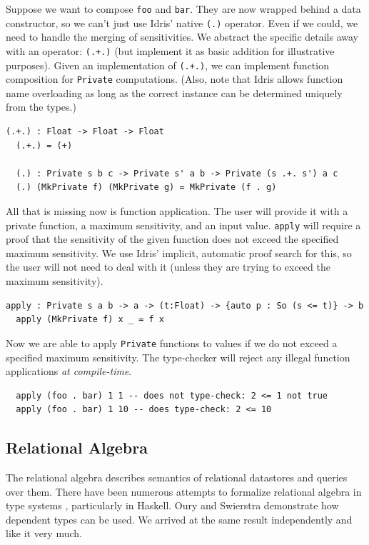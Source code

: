 \documentclass[12pt]{article}
\begin{document}
Suppose we want to compose \texttt{foo} and \texttt{bar}.
They are now wrapped behind a data constructor, so we can't just use Idris' native \texttt{(.)} operator.
Even if we could, we need to handle the merging of sensitivities.
We abstract the specific details away with an operator: \texttt{(.+.)} (but implement it as basic addition for illustrative purposes).
Given an implementation of \texttt{(.+.)}, we can implement function composition for \texttt{Private} computations.
(Also, note that Idris allows function name overloading as long as the correct instance can be determined uniquely from the types.)

\begin{lstlisting}[caption="Composing function sensitivity"]
  (.+.) : Float -> Float -> Float
  (.+.) = (+)

  (.) : Private s b c -> Private s' a b -> Private (s .+. s') a c
  (.) (MkPrivate f) (MkPrivate g) = MkPrivate (f . g)
\end{lstlisting}

All that is missing now is function application.
The user will provide it with a private function, a maximum sensitivity, and an input value.
\texttt{apply} will require a proof that the sensitivity of the given function does not exceed the specified maximum sensitivity.
We use Idris' implicit, automatic proof search for this, so the user will not need to deal with it (unless they are trying to exceed the maximum sensitivity).

\begin{lstlisting}[caption="Private function application"]
  apply : Private s a b -> a -> (t:Float) -> {auto p : So (s <= t)} -> b
  apply (MkPrivate f) x _ = f x
\end{lstlisting}

Now we are able to apply \texttt{Private} functions to values if we do not exceed a specified maximum sensitivity.
The type-checker will reject any illegal function applications \textit{at compile-time}.

\begin{lstlisting}
  apply (foo . bar) 1 1 -- does not type-check: 2 <= 1 not true
  apply (foo . bar) 1 10 -- does type-check: 2 <= 10
\end{lstlisting}

\subsection{Relational Algebra}

The relational algebra describes semantics of relational datastores and queries over them.
There have been numerous attempts to formalize relational algebra in type systems %
, particularly in Haskell.
Oury and Swierstra demonstrate how dependent types can be used\cite{OurySwierstra08PowerOfPi}.
We arrived at the same result independently and like it very much.
\end{document}
